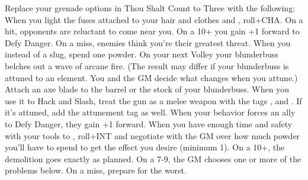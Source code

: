 \documentclass[darkmode]{dw_playbook}
\begin{document}
    {
            {Replace your grenade options in Thou Shalt Count to Three with the following:
            \gapSm
            \gapSm
            \gapSm
            }
        \gap
            {When you light the fuses attached to your hair and clothes and , roll+CHA.  On a hit, opponents are reluctant to come near you.  On a 10+ you gain +1 forward to Defy Danger.  On a miss, enemies think you're their greatest threat.}
        \gap
            {When you  instead of a slug, spend one powder.  On your next Volley your blunderbuss belches out a wave of arcane fire.  (The result may differ if your blunderbuss is attuned to an element.  You and the GM decide what changes when you attune.)}
        \gap
            {Attach an axe blade to the barrel or the stock of your blunderbuss.  When you use it to Hack and Slash, treat the gun as a melee weapon with the tags , and .  If it's attuned, add the attunement tag as well.}
            {When your behavior forces an ally to Defy Danger, they gain +1 forward.}
        \gap
            {When you have enough time and safety with your tools to , roll+INT and negotiate with the GM over how much powder you’ll have to spend to get the effect you desire (minimum 1).  On a 10+, the demolition goes exactly as planned.  On a 7-9, the GM chooses one or more of the problems below.  On a miss, prepare for the worst.
            \gapSm
}}
\end{document}
